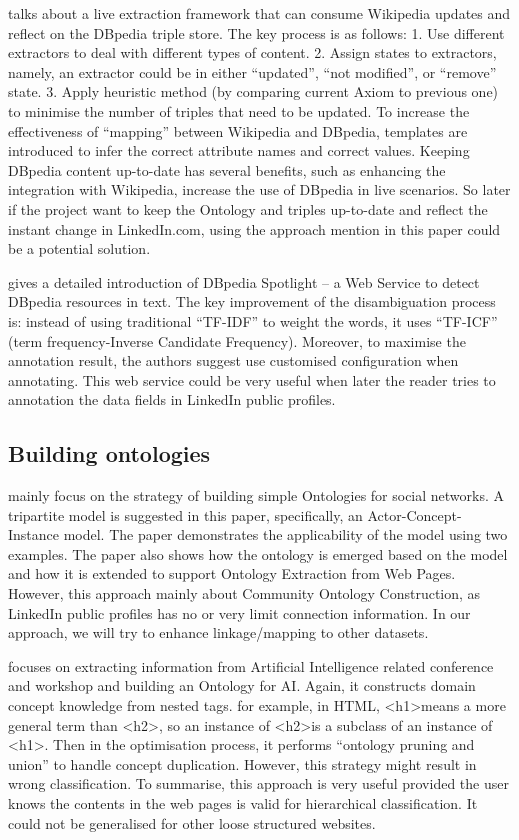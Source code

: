 \cite{hellmann2009} talks about a live extraction framework that can consume Wikipedia updates and reflect on the DBpedia triple store. The key process is as follows: 1. Use different extractors to deal with different types of content. 2. Assign states to extractors, namely, an extractor could be in either ``updated'', ``not modified'', or ``remove'' state. 3. Apply heuristic method (by comparing current Axiom to previous one) to minimise the number of triples that need to be updated. To increase the effectiveness of ``mapping'' between Wikipedia and DBpedia, templates are introduced to infer the correct attribute names and correct values. Keeping DBpedia content up-to-date has several benefits, such as enhancing the integration with Wikipedia, increase the use of DBpedia in live scenarios. So later if the project want to keep the Ontology and triples up-to-date and reflect the instant change in LinkedIn.com, using the approach mention in this paper could be a potential solution.

\cite{mendes2011} gives a detailed introduction of DBpedia Spotlight -- a Web Service to detect DBpedia resources in text. The key improvement of the disambiguation process is: instead of using traditional ``TF-IDF'' to weight the words, it uses ``TF-ICF'' (term frequency-Inverse Candidate Frequency). Moreover, to maximise the annotation result, the authors suggest use customised configuration when annotating. This web service could be very useful when later the reader tries to annotation the data fields in LinkedIn public profiles.

\subsection{Building ontologies}

\cite{mika2007} mainly focus on the strategy of building simple Ontologies for social networks. A tripartite model is suggested in this paper, specifically, an Actor-Concept-Instance model. The paper demonstrates the applicability of the model using two examples. The paper also shows how the ontology is emerged based on the model and how it is extended to support Ontology Extraction from Web Pages. However, this approach mainly about Community Ontology Construction, as LinkedIn public profiles has no or very limit connection information. In our approach, we will try to enhance linkage/mapping to other datasets.

\cite{wang2011} focuses on extracting information from Artificial Intelligence related conference and workshop and building an Ontology for AI. Again, it constructs domain concept knowledge from nested tags. for example, in HTML, \textless h1\textgreater means a more general term than \textless h2\textgreater, so an instance of \textless h2\textgreater is a subclass of an instance of \textless h1\textgreater. Then in the optimisation process, it performs ``ontology pruning and union'' to handle concept duplication. However, this strategy might result in wrong classification. To summarise, this approach is very useful provided the user knows the contents in the web pages is valid for hierarchical classification. It could not be generalised for other loose structured websites.

